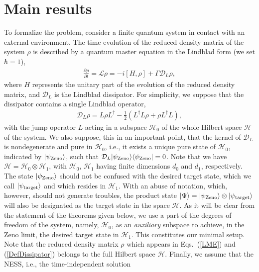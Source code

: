 \documentclass[aps,pra,letterpaper,twocolumn,showpacs,superscriptaddress,floatfix,longbibliography]{revtex4-1}
\begin{document}
\section{Main results}
To formalize the problem, consider a finite quantum system in contact
with an external environment.  The time evolution of the reduced
density matrix of the system $\rho$ is described by a quantum master
equation in the Lindblad form
\cite{Petruccione,PlenioJumps,ClarkPriorMPA2010} (we set $\hbar=1$),
\begin{align}
  \frac{\partial\rho}{\partial t}=\mathcal{L}\rho= -i\left[
    H,\rho\right] +\Gamma \mathcal{D}_L \rho,
  \label{LME}
\end{align}
where $H$ represents the unitary part of the evolution of the reduced
density matrix, and $\mathcal{D}_L$ is the Lindblad dissipator.  For
simplicity, we suppose that the dissipator contains a single Lindblad
operator,
\begin{align}
  \mathcal{D}_L\rho = L \rho L^\dag- \frac{1}{2} \left( L^\dag L \rho
    + \rho L^\dag L \right),
  \label{DefDissipator}
\end{align}
with the jump operator $L$ acting in a subspace $\mathcal{H}_0$ of the
whole Hilbert space $\mathcal{H}$ of the system.  We also suppose,
this in an important point, that the kernel of $\mathcal{D}_L$ is
nondegenerate and pure in $\mathcal{H}_0$, i.e., it exists a unique
pure state of $\mathcal{H}_0$, indicated by $|{\psi_{\rm{Zeno}}}\rangle$,
such that $\mathcal{D}_L
|{\psi_{\rm{Zeno}}}\rangle\langle{\psi_{\rm{Zeno}}}|=0$.  Note that we have $
\mathcal{H}= \mathcal{H}_0 \otimes \mathcal{H}_1$, with
$\mathcal{H}_0$, $\mathcal{H}_1$ having finite dimensions $d_0$ and
$d_1$, respectively. The state $|{\psi_{\rm{Zeno}}}\rangle$ should not be
confused with the desired target state, which we call
$|{\psi_{\rm{target}}}\rangle$ and which resides in $\mathcal{H}_1$.  With
an abuse of notation, which, however, should not generate troubles,
the product state $|{\Psi }\rangle = |{\psi_{\rm{Zeno}}}\rangle \otimes
|{\psi_{\rm{target}}}\rangle$ will also be designated as the target state
in the space $\mathcal{H}$.  As it will be clear from the statement of
the theorems given below, we use a part of the degrees of freedom of
the system, namely, $\mathcal{H}_0$, as an \textit{auxiliary} subspace
to achieve, in the Zeno limit, the desired target state in
$\mathcal{H}_1$. This constitutes our minimal setup.  Note that the
reduced density matrix $\rho$ which appears in Eqs.~(\ref{LME}) and
(\ref{DefDissipator}) belongs to the full Hilbert space $\mathcal{H}$.
Finally, we assume that the NESS, i.e., the time-independent solution
\end{document}
